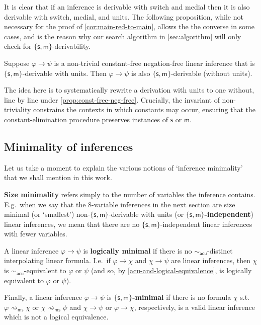 \documentclass[a4paper, UKenglish, cleveref]{lipics-v2021}
\renewcommand{\phi}{\varphi}
\newcommand{\m}{\ensuremath{\mathsf{m}}}
\newcommand{\s}{\ensuremath{\mathsf{s}}}
\newcommand{\ms}{\ensuremath{\mathsf{ms}}}
\newcommand{\acu}{\ensuremath{\mathsf{acu}}}
\begin{document}
It is clear that if an inference is derivable with switch and medial then it is also derivable with switch, medial, and units. The following proposition, while not necessary for the proof of \cref{cor:main-red-to-main}, allows the the converse in some cases, and is the reason why our search algorithm in \cref{sec:algorithm} will only check for $\{\s,\m\}$-derivability.

\begin{proposition}
\label{non-triv-const-free-neg-free-derivability-without-units}
  Suppose \(\phi \to \psi \) is a non-trivial constant-free negation-free linear inference that is $\{\s,\m \}$-derivable with units. Then \(\phi \to \psi\) is also $\{\s,\m \}$-derivable (without units).
\end{proposition}
The idea here is to systematically rewrite a derivation with units to one without, line by line under \cref{prop:const-free-neg-free}.
Crucially, the invariant of non-triviality constrains the contexts in which constants may occur, ensuring that the constant-elimination procedure preserves instances of $\s$ or $\m$.

%
%
%

\subsection{Minimality of inferences}
Let us take a moment to explain the various notions of `inference minimality' that we shall mention in this work.
%
%

%

\textbf{Size minimality} refers simply to the number of variables the inference contains. E.g.\ when we say that the \(8\)-variable inferences in the next section are size minimal (or `smallest') non-\(\{\s,\m\}\)-derivable with units (or \textbf{$\{\s,\m \}$-independent}) linear inferences, we mean that there are no \(\{\s,\m\}\)-independent linear inferences with fewer variables.

A linear inference \(\phi \to \psi\) is \textbf{logically minimal} if there is no $\sim_\acu$-distinct interpolating linear formula.
  I.e.\ if \(\phi \to \chi\) and \(\chi \to \psi\) are linear inferences, then $\chi$ is $\sim_\acu$-equivalent to $\phi$ or $\psi$ (and so, by \cref{acu-and-logical-equivalence}, is logically equivalent to \(\phi\) or \(\psi\)).


  Finally, a linear inference \(\phi \to \psi\) is \textbf{\(\{\s,\m\}\)-minimal} if there is no formula $\chi$ s.t.\ \(\phi \rightsquigarrow_\ms \chi\) or \(\chi \rightsquigarrow_\ms \psi\) and $\chi \to \psi$ or $\phi \to \chi$, respectively, is a valid linear inference which is not a logical equivalence.
\end{document}

